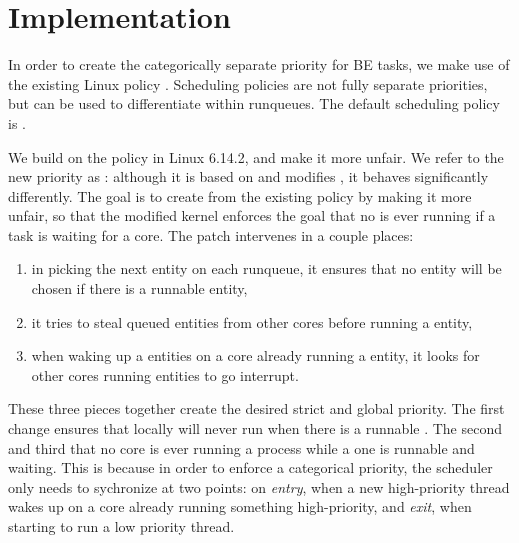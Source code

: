 \section{Implementation}\label{s:implementation}

In order to create the categorically separate priority for BE tasks, we make use
of the existing Linux policy \schedidle{}. Scheduling policies are not fully
separate priorities, but can be used to differentiate within runqueues. The
default scheduling policy is \schednormal{}.

We build on the \schedidle{} policy in Linux 6.14.2, and make it more
unfair. We refer to the new priority as \schedbe{}: although it
is based on and modifies \schedidle{}, it behaves significantly differently. The
goal is to create \schedbe{} from the existing \schedidle{} policy by making it
more unfair, so that the modified kernel enforces the goal that no \schedbe{} is
ever running if a \schednormal{} task is waiting for a core. The patch
intervenes in a couple places:
\begin{enumerate}
    \item in picking the next entity on each runqueue, it ensures that no
\schedbe{} entity will be chosen if there is a runnable \schednormal{} entity,
    \item it tries to steal queued \schednormal{} entities from other cores
before running a \schedbe{} entity,
    \item when waking up a \schednormal{} entities on a core already running a
    \schednormal{} entity, it looks for other cores running \schedbe{}
    entities to go interrupt.
\end{enumerate}

These three pieces together create the desired strict and global priority. The
first change ensures that locally \schedbe{} will never run when there is a
runnable \schednormal{}. The second and third that no core is ever running a
\schedbe{} process while a \schednormal{} one is runnable and waiting. This is
because in order to enforce a categorical priority, the scheduler only needs to
sychronize at two points: on \textit{entry}, when a new high-priority thread
wakes up on a core already running something high-priority, and \textit{exit},
when starting to run a low priority thread.

